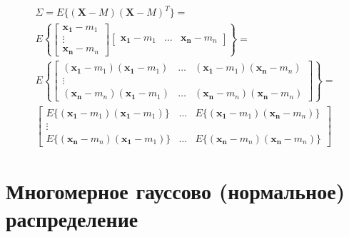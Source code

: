 \documentclass{beamer}
\begin{document}
\begin{frame}
  \frametitle{\insertsection}
  \framesubtitle{\insertsubsection}
  \begin{multline*}
    \Sigma = E\{(\mathbf{X} - M)(\mathbf{X} - M)^T\} =\\
    E \left\{
    \begin{bmatrix}
      \mathbf{x_1} - m_1\\
      \vdots\\
      \mathbf{x_n} - m_n
    \end{bmatrix}
    \begin{bmatrix}
      \mathbf{x_1} - m_1 & \ldots & \mathbf{x_n} - m_n
    \end{bmatrix}
    \right\} =\\
      E \left\{
      \begin{bmatrix}
        (\mathbf{x_1} - m_1)(\mathbf{x_1} - m_1) & \ldots & (\mathbf{x_1} - m_1)(\mathbf{x_n} - m_n)\\
        \vdots & &\\
        (\mathbf{x_n} - m_n)(\mathbf{x_1} - m_1) & \ldots & (\mathbf{x_n} - m_n)(\mathbf{x_n} - m_n)
      \end{bmatrix}
      \right\} =\\
      \begin{bmatrix}
        E\{(\mathbf{x_1} - m_1)(\mathbf{x_1} - m_1)\} & \ldots & E\{(\mathbf{x_1} - m_1)(\mathbf{x_n} - m_n)\}\\
        \vdots & &\\
        E\{(\mathbf{x_n} - m_n)(\mathbf{x_1} - m_1)\} & \ldots & E\{(\mathbf{x_n} - m_n)(\mathbf{x_n} - m_n)\}
      \end{bmatrix}
  \end{multline*}

\end{frame}

\section{Многомерное гауссово (нормальное) распределение}
\end{document}
